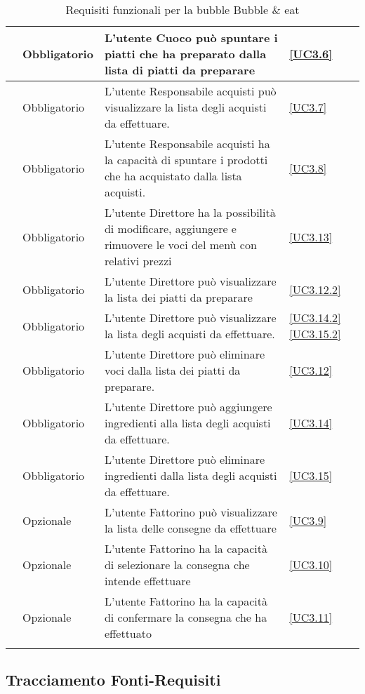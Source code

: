 \begin{longtable}{|P{1.5cm}|P{2.5cm}|P{6.5cm}|P{2.5cm}|}
	\hline \RequisitoObF\label{L26} & Obbligatorio & L'utente Cuoco può spuntare i piatti che ha preparato dalla lista di piatti da preparare  & \ref{UC3.6} \\
	\hline \RequisitoObF\label{L27} & Obbligatorio & L'utente Responsabile acquisti può visualizzare la lista degli acquisti da effettuare. & \ref{UC3.7} \\
	\hline \RequisitoObF\label{L28} & Obbligatorio & L'utente Responsabile acquisti ha la capacità di spuntare i prodotti che ha acquistato dalla lista acquisti.
	 & \ref{UC3.8} \\
	\hline \RequisitoObF\label{L29} & Obbligatorio & L'utente Direttore ha la possibilità di modificare, aggiungere e rimuovere le voci del menù con relativi prezzi & \ref{UC3.13} \\
	\hline \RequisitoObF\label{L30} & Obbligatorio & L'utente Direttore può visualizzare la lista dei piatti da preparare & \ref{UC3.12.2} \\
	\hline \RequisitoObF\label{L31} & Obbligatorio & L'utente Direttore può visualizzare la lista degli acquisti da effettuare. & \ref{UC3.14.2} \ref{UC3.15.2} \\
	\hline \RequisitoObF\label{L32} & Obbligatorio & L'utente Direttore può eliminare voci dalla lista dei piatti da preparare. & \ref{UC3.12} \\
	\hline \RequisitoObF\label{L53} & Obbligatorio & L'utente Direttore può aggiungere ingredienti alla lista degli acquisti da effettuare. & \ref{UC3.14}\\
	 \hline \RequisitoObF\label{L65} & Obbligatorio & L'utente Direttore  può eliminare ingredienti dalla lista degli acquisti da effettuare. & \ref{UC3.15} \\	 
	\hline \RequisitoOpF\label{L50} & Opzionale & L'utente Fattorino può visualizzare la lista delle consegne da effettuare & \ref{UC3.9} \\
	\hline \RequisitoOpF\label{L51} & Opzionale & L'utente Fattorino ha la capacità di selezionare la consegna che intende effettuare & \ref{UC3.10} \\
	\hline \RequisitoOpF\label{L52} & Opzionale & L'utente Fattorino ha la capacità di confermare la consegna che ha effettuato & \ref{UC3.11} \\
	\hline
	\caption{Requisiti funzionali per la bubble Bubble \& eat}
\end{longtable}

\subsection{Tracciamento Fonti-Requisiti}

